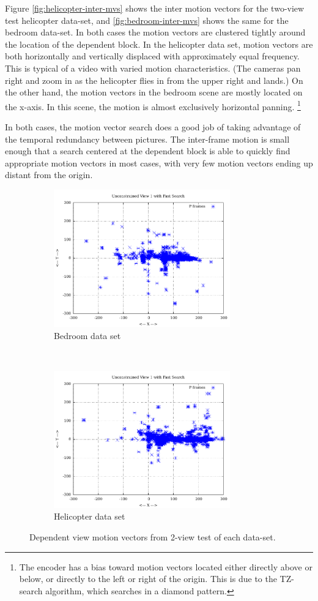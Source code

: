 \documentclass{sig-alternate-05-2015}
\begin{document}
Figure \ref{fig:helicopter-inter-mvs} shows the inter motion vectors for the
two-view test helicopter data-set, and \ref{fig:bedroom-inter-mvs} shows the
same for the bedroom data-set. In both cases the motion vectors are clustered
tightly around the location of the dependent block. In the helicopter data set,
motion vectors are both horizontally and vertically displaced with approximately
equal frequency. This is typical of a video with varied motion characteristics.
(The cameras pan right and zoom in as the helicopter flies in from the upper
right and lands.) On the other hand, the motion vectors in the bedroom scene are
mostly located on the x-axis. In this scene, the motion is almost exclusively
horizontal panning. \footnote{The encoder has a bias toward motion vectors
located either directly above or below, or directly to the left or right of the
origin. This is due to the TZ-search algorithm, which searches in a diamond
pattern.}

In both cases, the motion vector search does a good job of taking advantage of
the temporal redundancy between pictures. The inter-frame motion is small enough
that a search centered at the dependent block is able to quickly find appropriate
motion vectors in most cases, with very few motion vectors ending up distant from
the origin.

\begin{figure}[H]
\centering
\begin{subfigure}{.5\textwidth}
\centering
\includegraphics[width=3in]{figures/bedroom1-inter-view-mvs.pdf}
\caption{Bedroom data set}
\label{fig:bedroom-inter-view-mvs}
\end{subfigure} \\
\begin{subfigure}{.5\textwidth}
\centering
\includegraphics[width=3in]{figures/helicopter-inter-view-mvs.pdf}
\caption{Helicopter data set}
\label{fig:helicopter-inter-view-mvs}
\end{subfigure}
\caption{Dependent view motion vectors from 2-view test of each data-set.}
\label{fig:inter-view-mvs}
\end{figure}
\end{document}
